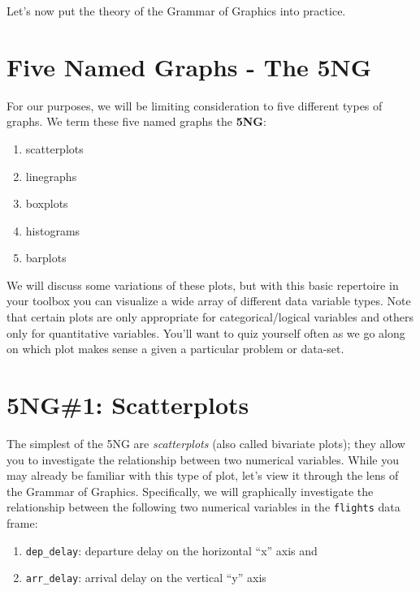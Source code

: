\documentclass[12pt,]{krantz}
\providecommand{\tightlist}{%
  \setlength{\itemsep}{0pt}\setlength{\parskip}{0pt}}
\theoremstyle{definition}
\theoremstyle{definition}
\theoremstyle{definition}
\theoremstyle{remark}
\begin{document}
Let's now put the theory of the Grammar of Graphics into practice.

\section{Five Named Graphs - The 5NG}\label{FiveNG}

For our purposes, we will be limiting consideration to five different
types of graphs. We term these five named graphs the \textbf{5NG}:

\begin{enumerate}
\def\labelenumi{\arabic{enumi}.}
\tightlist
\item
  scatterplots
\item
  linegraphs
\item
  boxplots
\item
  histograms
\item
  barplots
\end{enumerate}

We will discuss some variations of these plots, but with this basic
repertoire in your toolbox you can visualize a wide array of different
data variable types. Note that certain plots are only appropriate for
categorical/logical variables and others only for quantitative
variables. You'll want to quiz yourself often as we go along on which
plot makes sense a given a particular problem or data-set.

\section{5NG\#1: Scatterplots}\label{scatterplots}

The simplest of the 5NG are \emph{scatterplots} (also called bivariate
plots); they allow you to investigate the relationship between two
numerical variables. While you may already be familiar with this type of
plot, let's view it through the lens of the Grammar of Graphics.
Specifically, we will graphically investigate the relationship between
the following two numerical variables in the \texttt{flights} data
frame:

\begin{enumerate}
\def\labelenumi{\arabic{enumi}.}
\tightlist
\item
  \texttt{dep\_delay}: departure delay on the horizontal ``x'' axis and
\item
  \texttt{arr\_delay}: arrival delay on the vertical ``y'' axis
\end{enumerate}
\end{document}

